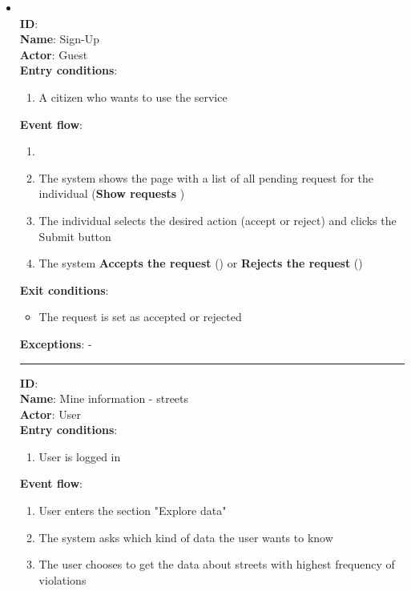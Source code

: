 \begin{enumerate}
\begin{itemize}
		\item{  } \\
		\textbf{ID}:  \\
		\textbf{Name}: Sign-Up \\
		\textbf{Actor}: Guest \\
		\textbf{Entry conditions}:
		\begin{enumerate}
			\item{A citizen who wants to use the service}
		\end{enumerate}
		\textbf{Event flow}:
		\begin{enumerate}
			\item{}
			\item{The system shows the page with a list of all pending request for the individual (\textbf{Show requests} )}
			\item{The individual selects the desired action (accept or reject) and clicks the Submit button}
			\item{The system \textbf{Accepts the request} () or \textbf{Rejects the request} ()}
		\end{enumerate}
		\textbf{Exit conditions}:
		\begin{itemize}
			\item{The request is set as accepted or rejected}
		\end{itemize}
		\textbf{Exceptions}: - \\
		\rule{\linewidth}{0.4pt}
		\textbf{ID}:  \\
		\textbf{Name}: Mine information - streets \\
		\textbf{Actor}: User  \\
		\textbf{Entry conditions}:
		\begin{enumerate}
			\item{User is logged in}
		\end{enumerate}
		\textbf{Event flow}:
		\begin{enumerate}
			\item{User enters the section "Explore data"}
			\item{The system asks which kind of data the user wants to know}
      \item{The user chooses to get the data about streets with highest frequency of violations}

\end{enumerate}
\end{itemize}
\end{enumerate}
